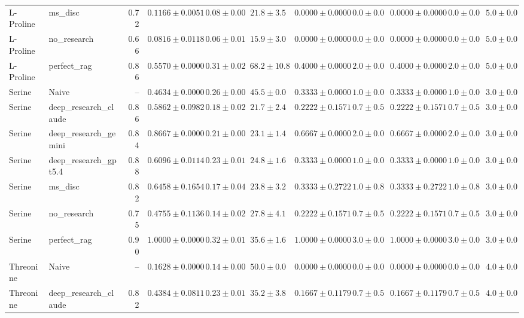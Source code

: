 \begin{table}[htbp]
\begin{tabular}{llrrrrrrrrr}
L-Proline & ms_disc & 0.72 & $0.1166 \pm 0.0051$ & $0.08 \pm 0.00$ & $21.8 \pm 3.5$ & $0.0000 \pm 0.0000$ & $0.0 \pm 0.0$ & $0.0000 \pm 0.0000$ & $0.0 \pm 0.0$ & $5.0 \pm 0.0$ \\
L-Proline & no_research & 0.66 & \cellcolor{red!25}$0.0816 \pm 0.0118$ & $0.06 \pm 0.01$ & $15.9 \pm 3.0$ & $0.0000 \pm 0.0000$ & $0.0 \pm 0.0$ & $0.0000 \pm 0.0000$ & $0.0 \pm 0.0$ & $5.0 \pm 0.0$ \\
L-Proline & perfect_rag & 0.86 & \cellcolor{green!25}$0.5570 \pm 0.0000$ & $0.31 \pm 0.02$ & $68.2 \pm 10.8$ & $0.4000 \pm 0.0000$ & $2.0 \pm 0.0$ & $0.4000 \pm 0.0000$ & $2.0 \pm 0.0$ & $5.0 \pm 0.0$ \\
\midrule
Serine & Naive & -- & \cellcolor{red!25}$0.4634 \pm 0.0000$ & $0.26 \pm 0.00$ & $45.5 \pm 0.0$ & $0.3333 \pm 0.0000$ & $1.0 \pm 0.0$ & $0.3333 \pm 0.0000$ & $1.0 \pm 0.0$ & $3.0 \pm 0.0$ \\
Serine & deep_research_claude & 0.86 & $0.5862 \pm 0.0982$ & $0.18 \pm 0.02$ & $21.7 \pm 2.4$ & $0.2222 \pm 0.1571$ & $0.7 \pm 0.5$ & $0.2222 \pm 0.1571$ & $0.7 \pm 0.5$ & $3.0 \pm 0.0$ \\
Serine & deep_research_gemini & 0.84 & $0.8667 \pm 0.0000$ & $0.21 \pm 0.00$ & $23.1 \pm 1.4$ & $0.6667 \pm 0.0000$ & $2.0 \pm 0.0$ & $0.6667 \pm 0.0000$ & $2.0 \pm 0.0$ & $3.0 \pm 0.0$ \\
Serine & deep_research_gpt5.4 & 0.88 & $0.6096 \pm 0.0114$ & $0.23 \pm 0.01$ & $24.8 \pm 1.6$ & $0.3333 \pm 0.0000$ & $1.0 \pm 0.0$ & $0.3333 \pm 0.0000$ & $1.0 \pm 0.0$ & $3.0 \pm 0.0$ \\
Serine & ms_disc & 0.82 & $0.6458 \pm 0.1654$ & $0.17 \pm 0.04$ & $23.8 \pm 3.2$ & $0.3333 \pm 0.2722$ & $1.0 \pm 0.8$ & $0.3333 \pm 0.2722$ & $1.0 \pm 0.8$ & $3.0 \pm 0.0$ \\
Serine & no_research & 0.75 & $0.4755 \pm 0.1136$ & $0.14 \pm 0.02$ & $27.8 \pm 4.1$ & $0.2222 \pm 0.1571$ & $0.7 \pm 0.5$ & $0.2222 \pm 0.1571$ & $0.7 \pm 0.5$ & $3.0 \pm 0.0$ \\
Serine & perfect_rag & 0.90 & \cellcolor{green!25}$1.0000 \pm 0.0000$ & $0.32 \pm 0.01$ & $35.6 \pm 1.6$ & $1.0000 \pm 0.0000$ & $3.0 \pm 0.0$ & $1.0000 \pm 0.0000$ & $3.0 \pm 0.0$ & $3.0 \pm 0.0$ \\
\midrule
Threonine & Naive & -- & \cellcolor{red!25}$0.1628 \pm 0.0000$ & $0.14 \pm 0.00$ & $50.0 \pm 0.0$ & $0.0000 \pm 0.0000$ & $0.0 \pm 0.0$ & $0.0000 \pm 0.0000$ & $0.0 \pm 0.0$ & $4.0 \pm 0.0$ \\
Threonine & deep_research_claude & 0.82 & $0.4384 \pm 0.0811$ & $0.23 \pm 0.01$ & $35.2 \pm 3.8$ & $0.1667 \pm 0.1179$ & $0.7 \pm 0.5$ & $0.1667 \pm 0.1179$ & $0.7 \pm 0.5$ & $4.0 \pm 0.0$ \\

\end{tabular}
\end{table}
